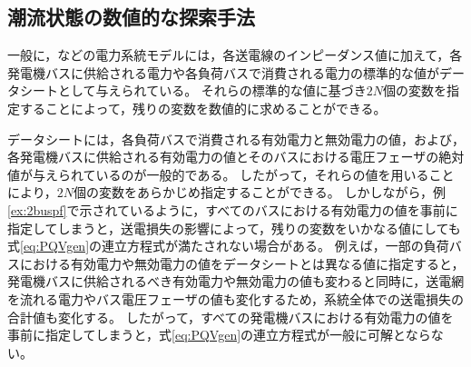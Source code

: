 \documentclass[tombow,dvipdfmx]{corona-a5}
\begin{document}




\subsection{潮流状態の数値的な探索手法}


一般に，などの電力系統モデルには，各送電線のインピーダンス値に加えて，各発電機バスに供給される電力や各負荷バスで消費される電力の標準的な値がデータシートとして与えられている。
それらの標準的な値に基づき$2N$個の変数を指定することによって，残りの変数を数値的に求めることができる。


データシートには，各負荷バスで消費される有効電力と無効電力の値，および，各発電機バスに供給される有効電力の値とそのバスにおける電圧フェーザの絶対値が与えられているのが一般的である。
したがって，それらの値を用いることにより，$2N$個の変数をあらかじめ指定することができる。
しかしながら，例\ref{ex:2buspf}で示されているように，すべてのバスにおける有効電力の値を事前に指定してしまうと，送電損失の影響によって，残りの変数をいかなる値にしても式\ref{eq:PQVgen}の連立方程式が満たされない場合がある。
例えば，一部の負荷バスにおける有効電力や無効電力の値をデータシートとは異なる値に指定すると，発電機バスに供給されるべき有効電力や無効電力の値も変わると同時に，送電網を流れる電力やバス電圧フェーザの値も変化するため，系統全体での送電損失の合計値も変化する。
したがって，すべての発電機バスにおける有効電力の値を事前に指定してしまうと，式\ref{eq:PQVgen}の連立方程式が一般に可解とならない。
\end{document}
